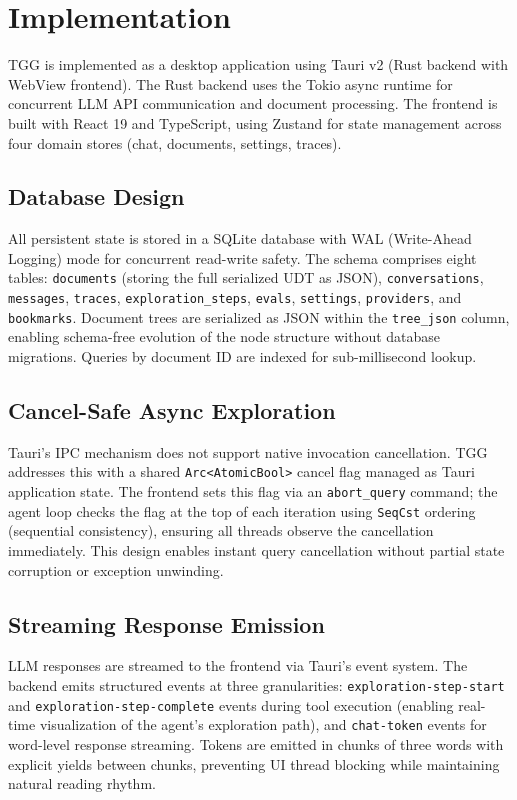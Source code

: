 \documentclass[conference]{IEEEtran}
\begin{document}
\section{Implementation}

TGG is implemented as a desktop application using Tauri v2 (Rust backend with WebView frontend). The Rust backend uses the Tokio async runtime for concurrent LLM API communication and document processing. The frontend is built with React 19 and TypeScript, using Zustand for state management across four domain stores (chat, documents, settings, traces).

\subsection{Database Design}

All persistent state is stored in a SQLite database with WAL (Write-Ahead Logging) mode for concurrent read-write safety. The schema comprises eight tables: \texttt{documents} (storing the full serialized UDT as JSON), \texttt{conversations}, \texttt{messages}, \texttt{traces}, \texttt{exploration\_steps}, \texttt{evals}, \texttt{settings}, \texttt{providers}, and \texttt{bookmarks}. Document trees are serialized as JSON within the \texttt{tree\_json} column, enabling schema-free evolution of the node structure without database migrations. Queries by document ID are indexed for sub-millisecond lookup.

\subsection{Cancel-Safe Async Exploration}

Tauri's IPC mechanism does not support native invocation cancellation. TGG addresses this with a shared \texttt{Arc<AtomicBool>} cancel flag managed as Tauri application state. The frontend sets this flag via an \texttt{abort\_query} command; the agent loop checks the flag at the top of each iteration using \texttt{SeqCst} ordering (sequential consistency), ensuring all threads observe the cancellation immediately. This design enables instant query cancellation without partial state corruption or exception unwinding.

\subsection{Streaming Response Emission}

LLM responses are streamed to the frontend via Tauri's event system. The backend emits structured events at three granularities: \texttt{exploration-step-start} and \texttt{exploration-step-complete} events during tool execution (enabling real-time visualization of the agent's exploration path), and \texttt{chat-token} events for word-level response streaming. Tokens are emitted in chunks of three words with explicit yields between chunks, preventing UI thread blocking while maintaining natural reading rhythm.
\end{document}
